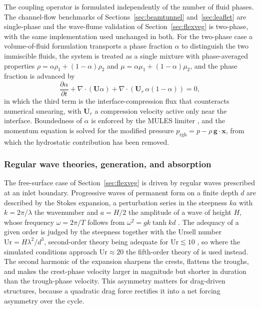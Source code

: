 \noindent
The coupling operator is formulated independently of the number of fluid phases. The channel-flow benchmarks of Sections~\ref{sec:beamtunnel} and~\ref{sec:leaflet} are single-phase and the wave-flume validation of Section~\ref{sec:flexveg} is two-phase, with the same implementation used unchanged in both. For the two-phase case a volume-of-fluid formulation transports a phase fraction $\alpha$ to distinguish the two immiscible fluids, the system is treated as a single mixture with phase-averaged properties $\rho = \alpha \rho_1 + (1-\alpha)\rho_2$ and $\mu = \alpha \mu_1 + (1-\alpha)\mu_2$, and the phase fraction is advanced by
\begin{equation}
\frac{\partial \alpha}{\partial t}
+ \nabla \cdot (\mathbf{U}\alpha)
+ \nabla \cdot \left(\mathbf{U}_r\,\alpha(1-\alpha)\right) = 0,
\label{eq:alphaTransportCompressed}
\end{equation}
in which the third term is the interface-compression flux that counteracts numerical smearing, with $\mathbf{U}_r$ a compression velocity active only near the interface. Boundedness of $\alpha$ is enforced by the MULES limiter \citep{damian_extended_2014}, and the momentum equation is solved for the modified pressure $p_{\mathrm{rgh}} = p - \rho\,\mathbf{g}\cdot\mathbf{x}$, from which the hydrostatic contribution has been removed.

\subsubsection{Regular wave theories, generation, and absorption}
\label{sec:theory_waves}
The free-surface case of Section~\ref{sec:flexveg} is driven by regular waves prescribed at an inlet boundary. Progressive waves of permanent form on a finite depth $d$ are described by the Stokes expansion, a perturbation series in the steepness $ka$ with $k = 2\pi/\lambda$ the wavenumber and $a = H/2$ the amplitude of a wave of height $H$, whose frequency $\omega = 2\pi/T$ follows from $\omega^2 = g k \tanh kd$ \citep{dean_water_1991}. The adequacy of a given order is judged by the steepness together with the Ursell number $\mathrm{Ur} = H\lambda^2/d^3$, second-order theory being adequate for $\mathrm{Ur} \lesssim 10$ \citep{dean_water_1991}, so where the simulated conditions approach $\mathrm{Ur} \approx 20$ the fifth-order theory of \citet{fenton_fifth_1985} is used instead. The second harmonic of the expansion sharpens the crests, flattens the troughs, and makes the crest-phase velocity larger in magnitude but shorter in duration than the trough-phase velocity. This asymmetry matters for drag-driven structures, because a quadratic drag force rectifies it into a net forcing asymmetry over the cycle.

